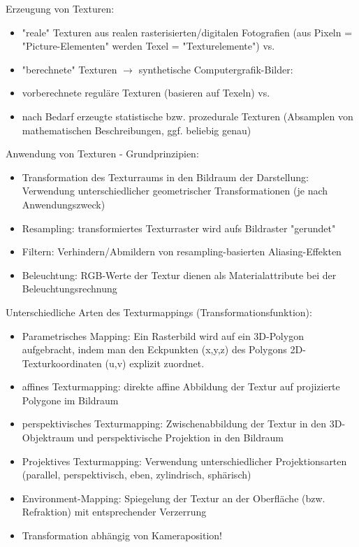 \documentclass[10pt,landscape]{article}
\begin{document}
\begin{multicols}{3}
Erzeugung von Texturen:
\begin{itemize}
  \item "reale" Texturen aus realen rasterisierten/digitalen Fotografien (aus Pixeln = "Picture-Elementen" werden Texel = "Texturelemente") vs.
  \item "berechnete" Texturen $\rightarrow$ synthetische Computergrafik-Bilder:
  \item vorberechnete reguläre Texturen (basieren auf Texeln) vs.
  \item nach Bedarf erzeugte statistische bzw. prozedurale Texturen (Absamplen von mathematischen Beschreibungen, ggf. beliebig genau)
\end{itemize}

Anwendung von Texturen - Grundprinzipien:
\begin{itemize}
  \item Transformation des Texturraums in den Bildraum der Darstellung: Verwendung unterschiedlicher geometrischer Transformationen (je nach Anwendungszweck)
  \item Resampling: transformiertes Texturraster wird aufs Bildraster "gerundet"
  \item Filtern: Verhindern/Abmildern von resampling-basierten Aliasing-Effekten
  \item Beleuchtung: RGB-Werte der Textur dienen als Materialattribute bei der Beleuchtungsrechnung
\end{itemize}

Unterschiedliche Arten des Texturmappings (Transformationsfunktion):
\begin{itemize}
  \item Parametrisches Mapping: Ein Rasterbild wird auf ein 3D-Polygon aufgebracht, indem man den Eckpunkten (x,y,z) des Polygons 2D-Texturkoordinaten (u,v) explizit zuordnet.
  \item affines Texturmapping: direkte affine Abbildung der Textur auf projizierte Polygone im Bildraum
  \item perspektivisches Texturmapping: Zwischenabbildung der Textur in den 3D-Objektraum und perspektivische Projektion in den Bildraum
  \item Projektives Texturmapping: Verwendung unterschiedlicher Projektionsarten (parallel, perspektivisch, eben, zylindrisch, sphärisch)
  \item Environment-Mapping: Spiegelung der Textur an der Oberfläche (bzw. Refraktion) mit entsprechender Verzerrung
  \item Transformation abhängig von Kameraposition!
\end{itemize}


\end{multicols}
\end{document}

